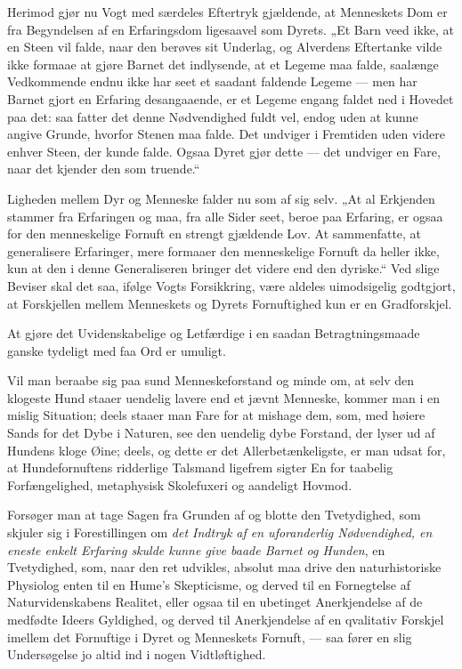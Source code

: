\documentclass[12pt,a4paper]{book}
\begin{document}
Herimod gjør nu Vogt med særdeles Eftertryk gjældende, at Menneskets Dom er fra
Begyndelsen af en Erfaringsdom ligesaavel som Dyrets. „Et Barn veed ikke, at en
Steen vil falde, naar den berøves sit Underlag, og Alverdens Eftertanke vilde
ikke formaae at gjøre Barnet det indlysende, at et Legeme maa falde, saalænge
Vedkommende endnu ikke har seet et saadant faldende Legeme --- men har Barnet
gjort en Erfaring desangaaende, er et Legeme engang faldet ned i Hovedet paa
det: saa fatter det denne Nødvendighed fuldt vel, endog uden at kunne angive
Grunde, hvorfor Stenen maa falde. Det undviger i Fremtiden uden videre enhver
Steen, der kunde falde. Ogsaa Dyret gjør dette --- det undviger en Fare, naar
det kjender den som truende.“

Ligheden mellem Dyr og Menneske falder nu som af sig selv. „At al Erkjenden
stammer fra Erfaringen og maa, fra alle Sider seet, beroe paa Erfaring, er
ogsaa for den menneskelige Fornuft en strengt gjældende Lov. At sammenfatte, at
generalisere Erfaringer, mere formaaer den menneskelige Fornuft da heller ikke,
kun at den i denne Generaliseren bringer det videre end den dyriske.“ Ved slige
Beviser skal det saa, ifølge Vogts Forsikkring, være aldeles uimodsigelig
godtgjort, at Forskjellen mellem Menneskets og Dyrets Fornuftighed kun er en
Gradforskjel.

At gjøre det Uvidenskabelige og Letfærdige i en saadan Betragtningsmaade ganske
tydeligt med faa Ord er umuligt.

Vil man beraabe sig paa sund Menneskeforstand og minde om, at selv den klogeste
Hund staaer uendelig lavere end et jævnt Menneske, kommer man i en mislig
Situation; deels staaer man Fare for at mishage dem, som, med høiere Sands for
det Dybe i Naturen, see den uendelig dybe Forstand, der lyser ud af Hundens
kloge Øine; deels, og dette er det Allerbetænkeligste, er man udsat for, at
Hundefornuftens ridderlige Talsmand ligefrem sigter En for taabelig
Forfængelighed, metaphysisk Skolefuxeri og aandeligt Hovmod.

Forsøger man at tage Sagen fra Grunden af og blotte den Tvetydighed, som skjuler
sig i Forestillingen om \emph{det Indtryk af en uforanderlig Nødvendighed, en
eneste enkelt Erfaring skulde kunne give baade Barnet og Hunden}, en
Tvetydighed, som, naar den ret udvikles, absolut maa drive den naturhistoriske
Physiolog enten til en Hume's Skepticisme, og derved til en Fornegtelse af
Naturvidenskabens Realitet, eller ogsaa til en ubetinget Anerkjendelse af de
medfødte Ideers Gyldighed, og derved til Anerkjendelse af en qvalitativ Forskjel
imellem det Fornuftige i Dyret og Menneskets Fornuft, --- saa fører en slig
Undersøgelse jo altid ind i nogen Vidtløftighed.
\end{document}
